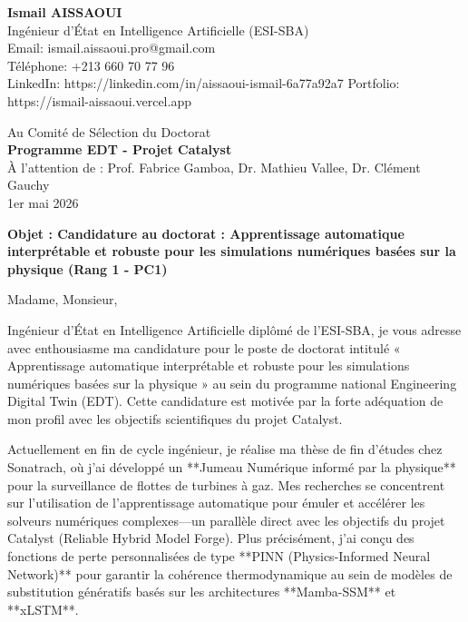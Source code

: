 \documentclass[11pt,a4paper]{article}
\begin{document}
\noindent \textbf{Ismail AISSAOUI} \\
Ingénieur d'État en Intelligence Artificielle (ESI-SBA) \\
Email: ismail.aissaoui.pro@gmail.com \\
Téléphone: +213 660 70 77 96 \\
LinkedIn: https://linkedin.com/in/aissaoui-ismail-6a77a92a7
Portfolio: https://ismail-aissaoui.vercel.app

\bigskip

\begin{flushright}
    Au Comité de Sélection du Doctorat \\
    \textbf{Programme EDT - Projet Catalyst} \\
    À l'attention de : Prof. Fabrice Gamboa, Dr. Mathieu Vallee, Dr. Clément Gauchy \\
    \medskip
    1er mai 2026
\end{flushright}

\bigskip

\noindent \textbf{Objet : Candidature au doctorat : Apprentissage automatique interprétable et robuste pour les simulations numériques basées sur la physique (Rang 1 - PC1)}

\bigskip

Madame, Monsieur,

Ingénieur d'État en Intelligence Artificielle diplômé de l'ESI-SBA, je vous adresse avec enthousiasme ma candidature pour le poste de doctorat intitulé « Apprentissage automatique interprétable et robuste pour les simulations numériques basées sur la physique » au sein du programme national Engineering Digital Twin (EDT). Cette candidature est motivée par la forte adéquation de mon profil avec les objectifs scientifiques du projet Catalyst.

Actuellement en fin de cycle ingénieur, je réalise ma thèse de fin d'études chez Sonatrach, où j'ai développé un **Jumeau Numérique informé par la physique** pour la surveillance de flottes de turbines à gaz. Mes recherches se concentrent sur l'utilisation de l'apprentissage automatique pour émuler et accélérer les solveurs numériques complexes—un parallèle direct avec les objectifs du projet Catalyst (Reliable Hybrid Model Forge). Plus précisément, j'ai conçu des fonctions de perte personnalisées de type **PINN (Physics-Informed Neural Network)** pour garantir la cohérence thermodynamique au sein de modèles de substitution génératifs basés sur les architectures **Mamba-SSM** et **xLSTM**.
\end{document}
